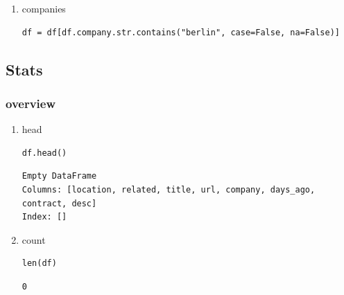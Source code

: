 \documentclass[11pt]{article}
\begin{document}
\begin{enumerate}
\begin{enumerate}
\item look in description
\label{sec:org503884e}
\begin{verbatim}
df = df[df.desc.str.contains(k, case=False, na=False)]
\end{verbatim}

\item {\bfseries\sffamily TODO} test
\label{sec:orgc2ccdc7}
goto Johnny Kitchin
\begin{verbatim}
k
\end{verbatim}

\begin{verbatim}
"# Out[91]:\n: 'database'"
\end{verbatim}
\end{enumerate}
\item companies
\label{sec:org8df7fbc}
\begin{verbatim}
df = df[df.company.str.contains("berlin", case=False, na=False)]
\end{verbatim}
\end{enumerate}

\subsection{Stats}
\label{sec:orgd193be2}
\subsubsection{overview}
\label{sec:orgbb959bb}
\begin{enumerate}
\item head
\label{sec:org9c402c6}
\begin{verbatim}
df.head()
\end{verbatim}

\begin{verbatim}
Empty DataFrame
Columns: [location, related, title, url, company, days_ago, contract, desc]
Index: []
\end{verbatim}

\item count
\label{sec:org0675d0c}
\begin{verbatim}
len(df)
\end{verbatim}

\begin{verbatim}
0
\end{verbatim}
\end{enumerate}
\end{document}
